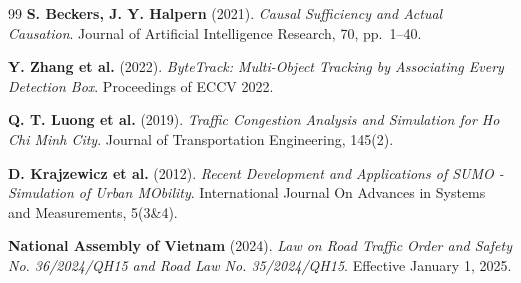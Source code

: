 \documentclass[12pt,a4paper]{report}
\begin{document}
\begin{thebibliography}{99}
\textbf{S. Beckers, J. Y. Halpern} (2021).
\textit{Causal Sufficiency and Actual Causation}.
Journal of Artificial Intelligence Research, 70, pp.~1--40.

\textbf{Y. Zhang et al.} (2022).
\textit{ByteTrack: Multi-Object Tracking by Associating Every Detection Box}.
Proceedings of ECCV 2022.

\textbf{Q. T. Luong et al.} (2019).
\textit{Traffic Congestion Analysis and Simulation for Ho Chi Minh City}.
Journal of Transportation Engineering, 145(2).

\textbf{D. Krajzewicz et al.} (2012).
\textit{Recent Development and Applications of SUMO - Simulation of Urban MObility}.
International Journal On Advances in Systems and Measurements, 5(3\&4).

\textbf{National Assembly of Vietnam} (2024).
\textit{Law on Road Traffic Order and Safety No. 36/2024/QH15 and Road Law No. 35/2024/QH15}.
Effective January 1, 2025.

\end{thebibliography}

\appendix

\newpage


\newpage


\newpage

\end{document}
